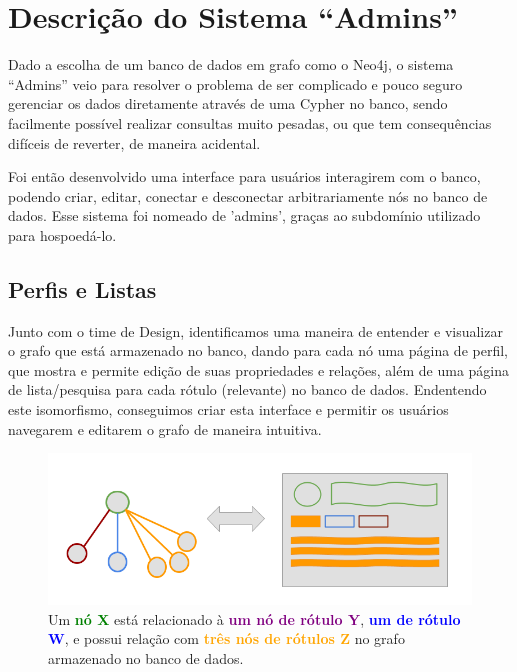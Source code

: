 \chapter{Descrição do Sistema ``Admins''}
\label{chap4}

Dado a escolha de um banco de dados em grafo como o Neo4j, o sistema ``Admins'' veio para resolver o problema de ser complicado e pouco seguro gerenciar os dados diretamente através de uma Cypher no banco, sendo facilmente possível realizar consultas muito pesadas, ou que tem consequências difíceis de reverter, de maneira acidental.

Foi então desenvolvido uma interface para usuários interagirem com o banco, podendo criar, editar, conectar e desconectar arbitrariamente nós no banco de dados. Esse sistema foi nomeado de 'admins', graças ao subdomínio utilizado para hospoedá-lo.

\section{Perfis e Listas}

Junto com o time de Design, identificamos uma maneira de entender e visualizar o grafo que está armazenado no banco, dando para cada nó uma página de perfil, que mostra e permite edição de suas propriedades e relações, além de uma página de lista/pesquisa para cada rótulo (relevante) no banco de dados. Endentendo este isomorfismo, conseguimos criar esta interface e permitir os usuários navegarem e editarem o grafo de maneira intuitiva.

\begin{figure}[H]
    \centering
    \includegraphics[width=1.0\linewidth]{Imagens/chap04/perfil-isomorfismo.png}
    \caption{Um \textcolor{green}{\textbf{nó X}} está relacionado à \textcolor{purple}{\textbf{um nó de rótulo Y}}, \textcolor{blue}{\textbf{um de rótulo W}}, e possui relação com \textcolor{orange}{\textbf{três nós de rótulos Z}} no grafo armazenado no banco de dados.}
    \label{fig:isomorphism}
\end{figure}


